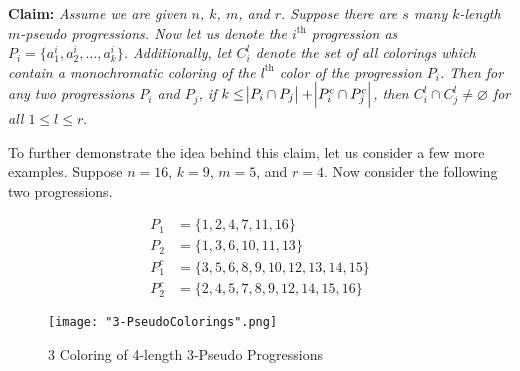 \documentclass[12pt, a4paper]{article}
\begin{document}
\vspace{2mm}

\textbf{Claim: }\textit{ Assume we are given $n$, $k$, $m$, and $r$. Suppose there are $s$ many $k$-length $m$-pseudo progressions. Now let us denote the $i^{\text{th}}$ progression as $P_i=\{a^i_1, a^i_2, \dots, a^i_k\}$. Additionally, let $C^l_{i}$ denote the set of all colorings which contain a monochromatic coloring of the $l^{\text{th}}$ color of the progression $P_i$. Then for any two progressions $P_i$ and $P_j$, if  $k\leq\abs{P_i\cap P_j}+\abs{P^c_i\cap P^c_j}$, then $C^l_i\cap C^l_j\neq\varnothing$ for all $1\leq l\leq r$}.

\newpage

\noindent To further demonstrate the idea behind this claim, let us consider a few more examples. Suppose $n=16$, $k=9$, $m=5$, and $r=4$. Now consider the following two progressions.

\begin{equation*}
    \begin{split}
        P_1 &= \{1, 2, 4, 7, 11, 16\} \\
        P_2 &= \{1, 3, 6, 10, 11, 13\} \\
        P_1^c &= \{3, 5, 6, 8, 9, 10, 12, 13, 14, 15\} \\
        P_2^c &= \{2, 4, 5, 7, 8, 9, 12, 14, 15, 16\}
    \end{split}
\end{equation*}





\newpage

\begin{figure}
    \begin{flushleft}
    \hspace{13mm}
    \texttt{[image: "3-PseudoColorings".png]}
    \caption{3 Coloring of 4-length 3-Pseudo Progressions}
    \label{fig:my_label}
    \end{flushleft}
\end{figure}
 
 
 
\end{document}
